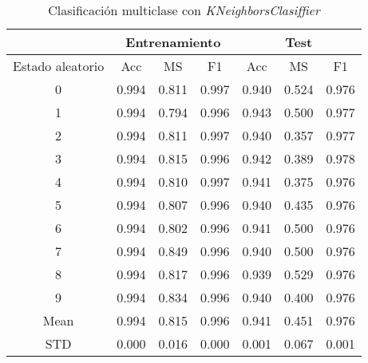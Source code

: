 \begin{table}[th]
	\centering
	\begin{tabular}{ |c|c|c|c|c|c|c| }
		\hline
		\rowcolor{LightCyan}
		 & \multicolumn{3}{c|}{Entrenamiento} & \multicolumn{3}{c|}{Test} \\
		\hline
		\rowcolor{LightCyan}
		 Estado aleatorio & Acc & MS & F1 & Acc & MS & F1 \\
		\hline
		0 & 0.994 & 0.811 & 0.997 & 0.940 & 0.524 & 0.976 \\
		1 & 0.994 & 0.794 & 0.996 & 0.943 & 0.500 & 0.977 \\
		2 & 0.994 & 0.811 & 0.997 & 0.940 & 0.357 & 0.977 \\
		3 & 0.994 & 0.815 & 0.996 & 0.942 & 0.389 & 0.978 \\
		4 & 0.994 & 0.810 & 0.997 & 0.941 & 0.375 & 0.976 \\
		5 & 0.994 & 0.807 & 0.996 & 0.940 & 0.435 & 0.976 \\
		6 & 0.994 & 0.802 & 0.996 & 0.941 & 0.500 & 0.976 \\
		7 & 0.994 & 0.849 & 0.996 & 0.940 & 0.500 & 0.976 \\
		8 & 0.994 & 0.817 & 0.996 & 0.939 & 0.529 & 0.976 \\
		9 & 0.994 & 0.834 & 0.996 & 0.940 & 0.400 & 0.976 \\
		Mean & 0.994 & 0.815 & 0.996 & 0.941 & 0.451 & 0.976 \\
		STD & 0.000 & 0.016 & 0.000 & 0.001 & 0.067 & 0.001 \\
		\hline
	\end{tabular}
	\caption{Clasificación multiclase con \textit{KNeighborsClasiffier}}
	\label{tabla:knn_multi}
\end{table}
